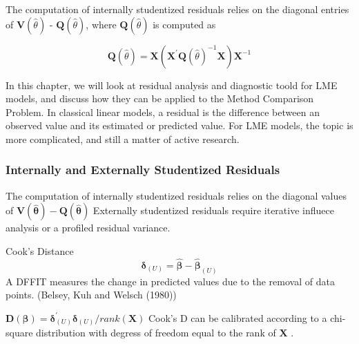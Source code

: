 \documentclass[12pt, a4paper]{report}
\theoremstyle{plain}
\theoremstyle{definition}
\theoremstyle{remark}
\begin{document}
	
	
The computation of internally studentized residuals relies on the diagonal entries of $\boldsymbol{V} (\hat{\theta})$ - $\boldsymbol{Q} (\hat{\theta})$, where $\boldsymbol{Q} (\hat{\theta})$ is computed as
	
	\[ \boldsymbol{Q} (\hat{\theta}) = \boldsymbol{X} ( \boldsymbol{X}^{\prime}\boldsymbol{Q} (\hat{\theta})^{-1}\boldsymbol{X})\boldsymbol{X}^{-1} \]
	
	

	
	
	
	
	In this chapter, we will look at residual analysis and diagnostic toold for LME models, and discuss how they can be applied to the Method Comparison Problem.	In classical linear models, a residual is the difference between an observed value and its estimated or predicted value. For LME models, the topic is more complicated, and still a matter of active research. 
	
	
	\subsubsection{Internally and Externally Studentized Residuals}
	The computation of internally studentized residuals relies on the diagonal values of $\boldsymbol{V(\hat{\theta})} - \boldsymbol{Q(\hat{\theta})}$
	Externally studentized residuals require iterative influece analysis or a profiled residual variance.
	
	Cook's Distance
	\[ \boldsymbol{\delta}_{(U)} = \boldsymbol{\hat{\beta}}  - \boldsymbol{\hat{\beta}}_{(U)} \]
	A DFFIT measures the change in predicted values due to the removal of data points.
	(Belsey, Kuh and Welsch (1980))
	
	$\boldsymbol{D(\beta)}  = \boldsymbol{\delta}^{\prime}_{(U)} \boldsymbol{\delta}_{(U)} / rank(\boldsymbol{X})$
	Cook's D can be calibrated according to a chi-square distribution with degress of freedom equal to the rank of $\boldsymbol{X}$ \citep{Christensen}.
	
	
\end{document}
